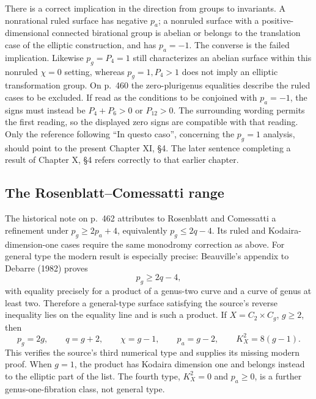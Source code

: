There is a correct implication in the direction from groups to invariants. A nonrational ruled surface has negative \(p_a\); a nonruled surface with a positive-dimensional connected birational group is abelian or belongs to the translation case of the elliptic construction, and has \(p_a=-1\). The converse is the failed implication. Likewise \(p_g=P_4=1\) still characterizes an abelian surface within this nonruled \(\chi=0\) setting, whereas \(p_g=1,P_4>1\) does not imply an elliptic transformation group. On p.~460 the zero-plurigenus equalities describe the ruled cases to be excluded. If read as the conditions to be conjoined with \(p_a=-1\), the signs must instead be \(P_4+P_6>0\) or \(P_{12}>0\). The surrounding wording permits the first reading, so the displayed zero signs are compatible with that reading. Only the reference following ``In questo caso'', concerning the \(p_g=1\) analysis, should point to the present Chapter XI, \S4. The later sentence completing a result of Chapter X, \S4 refers correctly to that earlier chapter.

\subsection{The Rosenblatt--Comessatti range}

The historical note on p.~462 attributes to Rosenblatt and Comessatti a refinement under \(p_g\ge2p_a+4\), equivalently \(p_g\le2q-4\). Its ruled and Kodaira-dimension-one cases require the same monodromy correction as above. For general type the modern result is especially precise: Beauville's appendix to Debarre (1982) proves
\[
p_g\ge2q-4,
\]
with equality precisely for a product of a genus-two curve and a curve of genus at least two. Therefore a general-type surface satisfying the source's reverse inequality lies on the equality line and is such a product. If \(X=C_2\times C_g\), \(g\ge2\), then
\[
p_g=2g,\qquad q=g+2,\qquad
\chi=g-1,\qquad p_a=g-2,\qquad K_X^2=8(g-1).
\]
This verifies the source's third numerical type and supplies its missing modern proof. When \(g=1\), the product has Kodaira dimension one and belongs instead to the elliptic part of the list. The fourth type, \(K_X^2=0\) and \(p_a\ge0\), is a further genus-one-fibration class, not general type.

